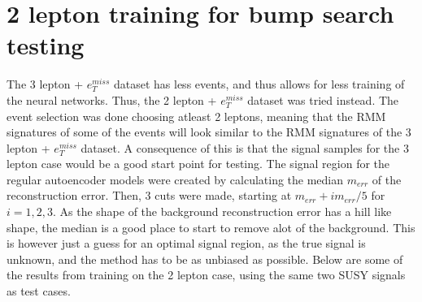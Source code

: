 
\section{2 lepton training for bump search testing}

The 3 lepton + $e_T^{miss}$ dataset has less events, and thus allows for less training of the neural networks. 
Thus, the 2 lepton + $e_T^{miss}$ dataset was tried instead. The event selection was done choosing atleast 
2 leptons, meaning that the RMM signatures of some of the events will look similar to the RMM signatures of 
the 3 lepton + $e_T^{miss}$ dataset. A consequence of this is that the signal samples for the 3 lepton case 
would be a good start point for testing. The signal region for the regular autoencoder models were created by 
calculating the median $m_{err}$ of the reconstruction error. Then, 3 cuts were made, starting at 
$m_{err} + im_{err}/5$ for $i = 1,2,3$. As the shape of the background reconstruction error has a hill like 
shape, the median is a good place to start to remove alot of the background. This is however just a guess 
for an optimal signal region, as the true signal is unknown, and the method has to be as unbiased as possible. 
Below are some of the results from training on the 2 lepton case, using the same two SUSY signals as test cases. 


